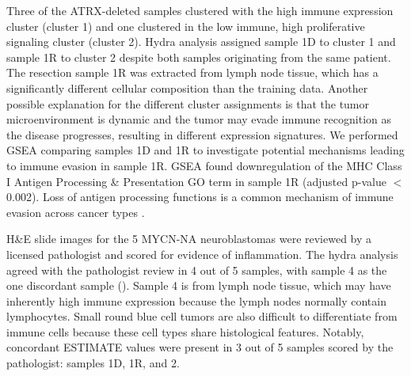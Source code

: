 \documentclass[10pt,letterpaper]{article}
\begin{document}
Three of the ATRX-deleted samples clustered with the high immune expression cluster (cluster 1) and one clustered in the low immune, high proliferative signaling cluster (cluster 2). Hydra analysis assigned sample 1D to cluster 1 and sample 1R to cluster 2 despite both samples originating from the same patient. The resection sample 1R was extracted from lymph node tissue, which has a significantly different cellular composition than the training data. Another possible explanation for the different cluster assignments is that the tumor microenvironment is dynamic and the tumor may evade immune recognition as the disease progresses, resulting in different expression signatures. We performed GSEA comparing samples 1D and 1R to investigate potential mechanisms leading to immune evasion in sample 1R. GSEA found downregulation of the MHC Class I Antigen Processing \& Presentation GO term in sample 1R (adjusted p-value $<$ 0.002). Loss of antigen processing functions is a common mechanism of immune evasion across cancer types \cite{reevesAntigenProcessingImmune2017}. 

H\&E slide images for the 5 MYCN-NA neuroblastomas were reviewed by a licensed pathologist and scored for evidence of inflammation. The hydra analysis agreed with the pathologist review in 4 out of 5 samples, with sample 4 as the one discordant sample (). Sample 4 is from lymph node tissue, which may have inherently high immune expression because the lymph nodes normally contain lymphocytes. Small round blue cell tumors are also difficult to differentiate from immune cells because these cell types share histological features. Notably, concordant ESTIMATE values were present in 3 out of 5 samples scored by the pathologist: samples 1D, 1R, and 2. 
\end{document}

